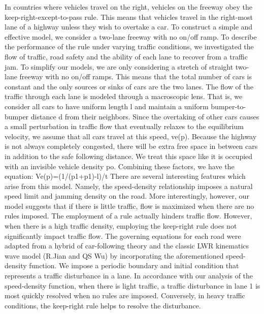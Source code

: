 In countries where vehicles travel on the right, vehicles on the freeway obey the keep-right-except-to-pass rule. This means that vehicles travel in the right-most lane of a highway unless they wish to overtake a car. To construct a simple and effective model, we consider a two-lane freeway with no on/off ramp. To describe the performance of the rule under varying traffic conditions, we investigated the flow of traffic, road safety and the ability of each lane to recover from a traffic jam. To simplify our models, we are only considering a stretch of straight two-lane freeway with no on/off ramps. This means that the total number of cars is constant and the only sources or sinks of cars are the two lanes. 
The flow of the traffic through each lane is modeled through a macroscopic lens. That is, we consider all cars to have uniform length l and maintain a uniform bumper-to-bumper distance d from their neighbors. Since the overtaking of other cars causes a small perturbation in traffic flow that eventually relaxes to the equilibrium velocity, we assume that all cars travel at this speed, ve(p). Because the highway is not always completely congested, there will be extra free space in between cars in addition to the safe following distance. We treat this space like it is occupied with an invisible vehicle density po. Combining these factors, we have the equation: Ve(p)=(1/(p1+p1)-l)/t
There are several interesting features which arise from this model. Namely, the speed-density relationship imposes a natural speed limit and jamming density on the road. More interestingly, however, our model suggests that if there is little traffic, flow is maximized when there are no rules imposed. The employment of a rule actually hinders traffic flow. However, when there is a high traffic density, employing the keep-right rule does not significantly impact traffic flow.  
The governing equations for each road were adapted from a hybrid of car-following theory and the classic LWR kinematics wave model (R.Jian and QS Wu) by incorporating the aforementioned speed-density function. We impose a periodic boundary and initial condition that represents a traffic disturbance in a lane. In accordance with our analysis of the speed-density function, when there is light traffic, a traffic disturbance in lane 1 is most quickly resolved when no rules are imposed. Conversely, in heavy traffic conditions, the keep-right rule helps to resolve the disturbance. 
